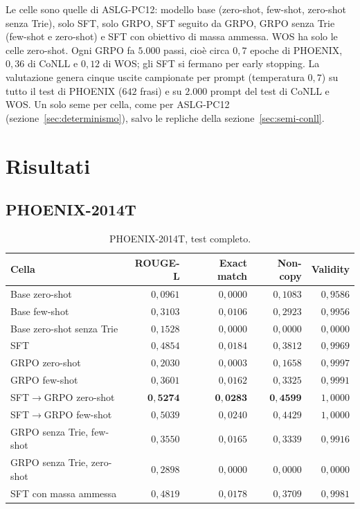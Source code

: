 Le celle sono quelle di ASLG-PC12: modello base (zero-shot, few-shot,
zero-shot senza Trie), solo SFT, solo GRPO, SFT seguito da GRPO, GRPO senza Trie
(few-shot e zero-shot) e SFT con obiettivo di massa ammessa. WOS ha solo le
celle zero-shot. Ogni GRPO fa $5.000$ passi, cioè circa $0{,}7$ epoche di
PHOENIX, $0{,}36$ di CoNLL e $0{,}12$ di WOS; gli SFT si fermano per early
stopping. La valutazione genera cinque uscite campionate per prompt
(temperatura $0{,}7$) su tutto il test di PHOENIX ($642$ frasi) e su $2.000$
prompt del test di CoNLL e WOS. Un solo seme per cella, come per ASLG-PC12
(sezione~\ref{sec:determinismo}), salvo le repliche della
sezione~\ref{sec:semi-conll}.

\section{Risultati}

\subsection{PHOENIX-2014T}

\begin{table}[h]
\centering
\small
\begin{tabular}{lrrrr}
\toprule
Cella & ROUGE-L & Exact match & Non-copy & Validity \\
\midrule
Base zero-shot                 & $0{,}0961$ & $0{,}0000$ & $0{,}1083$ & $0{,}9586$ \\
Base few-shot                  & $0{,}3103$ & $0{,}0106$ & $0{,}2923$ & $0{,}9956$ \\
Base zero-shot senza Trie      & $0{,}1528$ & $0{,}0000$ & $0{,}0000$ & $0{,}0000$ \\
SFT                            & $0{,}4854$ & $0{,}0184$ & $0{,}3812$ & $0{,}9969$ \\
GRPO zero-shot                 & $0{,}2030$ & $0{,}0003$ & $0{,}1658$ & $0{,}9997$ \\
GRPO few-shot                  & $0{,}3601$ & $0{,}0162$ & $0{,}3325$ & $0{,}9991$ \\
SFT$\to$GRPO zero-shot         & $\mathbf{0{,}5274}$ & $\mathbf{0{,}0283}$ & $\mathbf{0{,}4599}$ & $1{,}0000$ \\
SFT$\to$GRPO few-shot          & $0{,}5039$ & $0{,}0240$ & $0{,}4429$ & $1{,}0000$ \\
GRPO senza Trie, few-shot      & $0{,}3550$ & $0{,}0165$ & $0{,}3339$ & $0{,}9916$ \\
GRPO senza Trie, zero-shot     & $0{,}2898$ & $0{,}0000$ & $0{,}0000$ & $0{,}0000$ \\
SFT con massa ammessa          & $0{,}4819$ & $0{,}0178$ & $0{,}3709$ & $0{,}9981$ \\
\bottomrule
\end{tabular}
\caption{PHOENIX-2014T, test completo.}
\label{tab:risultati-phoenix}
\end{table}

